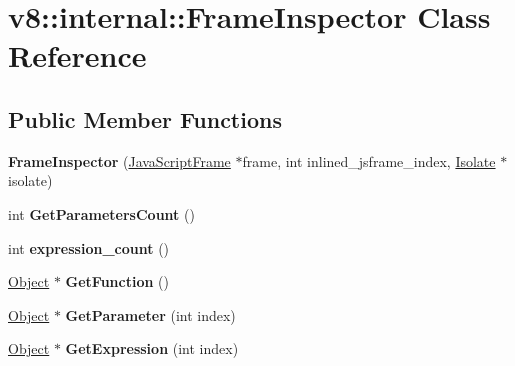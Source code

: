 \hypertarget{classv8_1_1internal_1_1_frame_inspector}{}\section{v8\+:\+:internal\+:\+:Frame\+Inspector Class Reference}
\label{classv8_1_1internal_1_1_frame_inspector}
\subsection*{Public Member Functions}
\begin{DoxyCompactItemize}
\item 
\hypertarget{classv8_1_1internal_1_1_frame_inspector_acfb4607583dd9db87a771e5f0fe1a6bf}{}{\bfseries Frame\+Inspector} (\hyperlink{classv8_1_1internal_1_1_java_script_frame}{Java\+Script\+Frame} $\ast$frame, int inlined\+\_\+jsframe\+\_\+index, \hyperlink{classv8_1_1internal_1_1_isolate}{Isolate} $\ast$isolate)\label{classv8_1_1internal_1_1_frame_inspector_acfb4607583dd9db87a771e5f0fe1a6bf}

\item 
\hypertarget{classv8_1_1internal_1_1_frame_inspector_ae868bb8c10b97fe67ac25db4931acdf1}{}int {\bfseries Get\+Parameters\+Count} ()\label{classv8_1_1internal_1_1_frame_inspector_ae868bb8c10b97fe67ac25db4931acdf1}

\item 
\hypertarget{classv8_1_1internal_1_1_frame_inspector_ae2f92928233260b12ae25ec36a5c2fde}{}int {\bfseries expression\+\_\+count} ()\label{classv8_1_1internal_1_1_frame_inspector_ae2f92928233260b12ae25ec36a5c2fde}

\item 
\hypertarget{classv8_1_1internal_1_1_frame_inspector_a50f3f24f22f57c38b04ff24fea633c93}{}\hyperlink{classv8_1_1internal_1_1_object}{Object} $\ast$ {\bfseries Get\+Function} ()\label{classv8_1_1internal_1_1_frame_inspector_a50f3f24f22f57c38b04ff24fea633c93}

\item 
\hypertarget{classv8_1_1internal_1_1_frame_inspector_a37e108603426e7ea463af3ad6034f975}{}\hyperlink{classv8_1_1internal_1_1_object}{Object} $\ast$ {\bfseries Get\+Parameter} (int index)\label{classv8_1_1internal_1_1_frame_inspector_a37e108603426e7ea463af3ad6034f975}

\item 
\hypertarget{classv8_1_1internal_1_1_frame_inspector_ab6d6b00a75e41a9c732ec41639e1b0a2}{}\hyperlink{classv8_1_1internal_1_1_object}{Object} $\ast$ {\bfseries Get\+Expression} (int index)\label{classv8_1_1internal_1_1_frame_inspector_ab6d6b00a75e41a9c732ec41639e1b0a2}


\end{DoxyCompactItemize}

